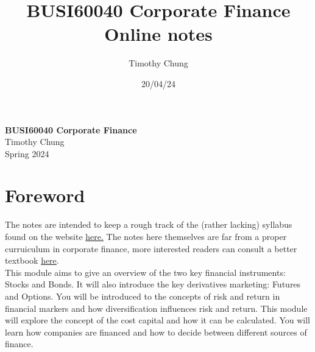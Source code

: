 \documentclass{report}
\title{BUSI60040 Corporate Finance Online notes}
\author{Timothy Chung}
\date{20/04/24}
\begin{document}

\setlength{\cftsecnumwidth}{4.2em} 

\begin{titlepage}
\centering
    \vspace*{1cm}
    \Huge
    \textbf{BUSI60040 Corporate Finance} \\
    \vspace{1cm}
    \Large
    Timothy Chung \\
    \vspace{1cm}
    Spring 2024 \\
    \vfill
\end{titlepage}

\setcounter{tocdepth}{1}
\tableofcontents
\newpage
\setcounter{chapter}{-1}
\chapter{Foreword}
The notes are intended to keep a rough track of the (rather lacking) syllabus found on the website \href{https://www.imperial.ac.uk/business-school/undergraduate/bpes/#programme-content}{here.} The notes here themselves are far from a proper curruiculum in corporate finance, more interested readers can consult a better textbook \href{https://book.ivo-welch.info/home/}{here}. \\

This module aims to give an overview of the two key financial instruments: Stocks and Bonds. It will also introduce the key derivatives marketing: Futures and  Options. You will be introduced to the concepts of risk and return in  financial markers  and how diversification influences risk and return. This module will explore the concept of the cost capital and how it can be calculated. You will learn how companies are financed and how to decide between different sources of finance. 











\end{document}

